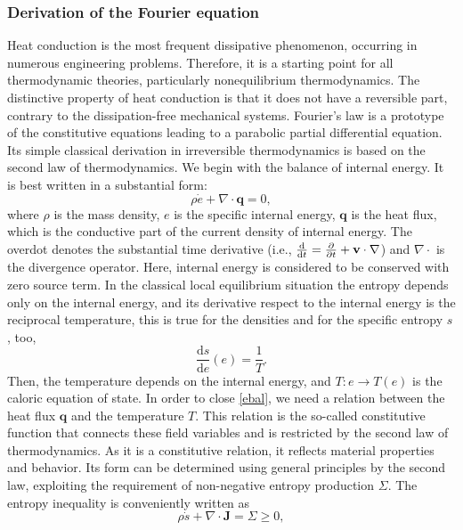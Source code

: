 \documentclass[sn-mathphys]{sn-jnl}%
\theoremstyle{thmstyleone}%
\theoremstyle{thmstyletwo}%
\theoremstyle{thmstylethree}%
\begin{document}
{\subsubsection{Derivation of the Fourier equation}
\label{Fderi}
Heat conduction is the most frequent dissipative phenomenon, occurring in numerous engineering problems. Therefore, it is a starting point for all thermodynamic theories, particularly nonequilibrium thermodynamics. The distinctive property of heat conduction is that it does not have a reversible part, contrary to the dissipation-free mechanical systems. Fourier's law  is a prototype of the constitutive equations leading to a parabolic partial differential equation. Its simple classical derivation in irreversible thermodynamics is based on the second law of thermodynamics. We begin with the balance of internal energy. It is best written in a substantial form:
\begin{equation}
	\rho \dot e +  \nabla \cdot \mathbf{q} = 0,
	\label{ebal}\end{equation}
where $\rho$ is the mass density, $e$ is the specific internal energy, $\mathbf{q}$ is the heat flux, which is the conductive part of the current density of internal energy. The overdot denotes the substantial time derivative (i.e., $\frac{\textrm{d}}{\textrm{d}t} = \frac{\partial}{\partial t} + {\bf v}\cdot\nabla$) and $\nabla\cdot$ is the divergence operator. Here, internal energy is considered to be conserved with zero source term. In the classical local equilibrium situation the entropy depends only on the internal energy, and its derivative respect to the internal energy is the reciprocal temperature, this is true for the densities and for the specific entropy $s$, too,
$$
\frac{\textrm{d} s}{\textrm{d} e}(e) = \frac{1}{T}.
$$
Then, the temperature depends on the internal energy, and $T: e\rightarrow T(e)$ is the caloric equation of state. In order to close \eqref{ebal}, we need a relation  between the heat flux $\mathbf{q}$ and the temperature $T$. This relation is the so-called constitutive function that connects these field variables and is restricted by the second law of thermodynamics. As	 it is a constitutive relation, it reflects material properties and behavior. Its form can be determined using general principles by the second law, exploiting the requirement of non-negative entropy production $\Sigma$. The entropy inequality is conveniently written as
\begin{equation}
	\rho \dot s + \nabla\cdot \mathbf{J}=\Sigma \geq 0,
	\label{sbal}\end{equation}
}
\end{document}
